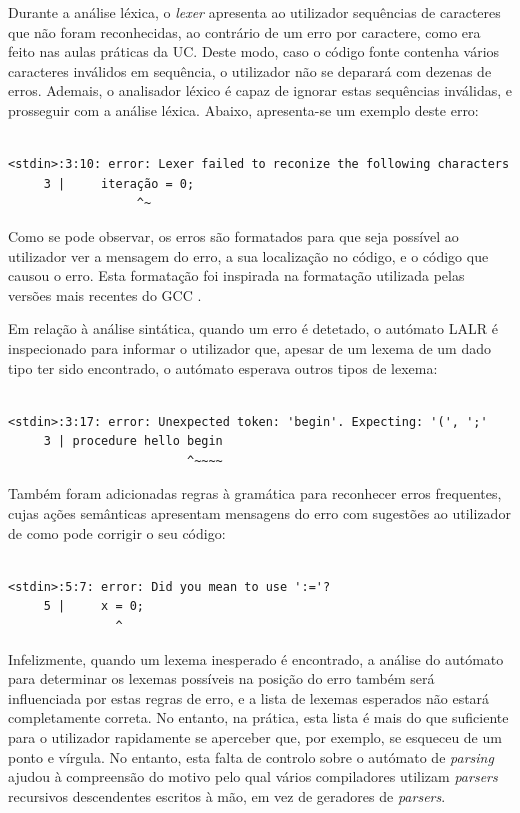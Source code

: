 \documentclass[12pt, a4paper]{article}
\begin{document}
Durante a análise léxica, o \emph{lexer} apresenta ao utilizador sequências de caracteres que não
foram reconhecidas, ao contrário de um erro por caractere, como era feito nas aulas práticas da UC.
Deste modo, caso o código fonte contenha vários caracteres inválidos em sequência, o utilizador não
se deparará com dezenas de erros. Ademais, o analisador léxico é capaz de ignorar estas sequências
inválidas, e prosseguir com a análise léxica. Abaixo, apresenta-se um exemplo deste erro:


\begin{lstlisting}

<stdin>:3:10: error: Lexer failed to reconize the following characters
     3 |     iteração = 0;
                  ^~
\end{lstlisting}

Como se pode observar, os erros são formatados para que seja possível ao utilizador ver a mensagem
do erro, a sua localização no código, e o código que causou o erro. Esta formatação foi inspirada na
formatação utilizada pelas versões mais recentes do GCC \cite{gcc-errors}.

Em relação à análise sintática, quando um erro é detetado, o autómato LALR é inspecionado para
informar o utilizador que, apesar de um lexema de um dado tipo ter sido encontrado, o autómato
esperava outros tipos de lexema:

\begin{lstlisting}

<stdin>:3:17: error: Unexpected token: 'begin'. Expecting: '(', ';'
     3 | procedure hello begin
                         ^~~~~
\end{lstlisting}

Também foram adicionadas regras à gramática para reconhecer erros frequentes, cujas ações semânticas
apresentam mensagens do erro com sugestões ao utilizador de como pode corrigir o seu código:

\begin{lstlisting}

<stdin>:5:7: error: Did you mean to use ':='?
     5 |     x = 0;
               ^
\end{lstlisting}

Infelizmente, quando um lexema inesperado é encontrado, a análise do autómato para determinar os
lexemas possíveis na posição do erro também será influenciada por estas regras de erro, e a lista
de lexemas esperados não estará completamente correta. No entanto, na prática, esta lista é mais
do que suficiente para o utilizador rapidamente se aperceber que, por exemplo, se esqueceu de um
ponto e vírgula. No entanto, esta falta de controlo sobre o autómato de \emph{parsing} ajudou à
compreensão do motivo pelo qual vários compiladores utilizam \emph{parsers} recursivos descendentes
escritos à mão, em vez de geradores de \emph{parsers}. \cite{compilers-handwritten-parser}
\end{document}
